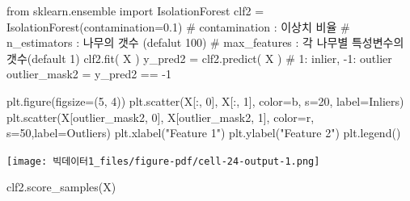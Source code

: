 \documentclass[
  a4paper,
  DIV=11,
  numbers=noendperiod]{scrreprt}
\newenvironment{Shaded}{\begin{snugshade}}{\end{snugshade}}
\newcommand{\CommentTok}[1]{\textcolor[rgb]{0.37,0.37,0.37}{#1}}
\newcommand{\DecValTok}[1]{\textcolor[rgb]{0.68,0.00,0.00}{#1}}
\newcommand{\FloatTok}[1]{\textcolor[rgb]{0.68,0.00,0.00}{#1}}
\newcommand{\ImportTok}[1]{\textcolor[rgb]{0.00,0.46,0.62}{#1}}
\newcommand{\NormalTok}[1]{\textcolor[rgb]{0.00,0.23,0.31}{#1}}
\newcommand{\OperatorTok}[1]{\textcolor[rgb]{0.37,0.37,0.37}{#1}}
\newcommand{\StringTok}[1]{\textcolor[rgb]{0.13,0.47,0.30}{#1}}
\begin{document}
\begin{Shaded}
\begin{Highlighting}[]
\ImportTok{from}\NormalTok{ sklearn.ensemble }\ImportTok{import}\NormalTok{ IsolationForest}
\NormalTok{clf2 }\OperatorTok{=}\NormalTok{ IsolationForest(contamination}\OperatorTok{=}\FloatTok{0.1}\NormalTok{)}
\CommentTok{\# contamination : 이상치 비율}
\CommentTok{\# n\_estimators : 나무의 갯수 (defalut 100)}
\CommentTok{\# max\_features : 각 나무별 특성변수의 갯수(default 1)}
\NormalTok{clf2.fit( X )}
\NormalTok{y\_pred2 }\OperatorTok{=}\NormalTok{ clf2.predict( X ) }\CommentTok{\# 1: inlier, {-}1: outlier}
\NormalTok{outlier\_mask2 }\OperatorTok{=}\NormalTok{ y\_pred2 }\OperatorTok{==} \OperatorTok{{-}}\DecValTok{1}

\NormalTok{plt.figure(figsize}\OperatorTok{=}\NormalTok{(}\DecValTok{5}\NormalTok{, }\DecValTok{4}\NormalTok{))}
\NormalTok{plt.scatter(X[:, }\DecValTok{0}\NormalTok{], X[:, }\DecValTok{1}\NormalTok{], color}\OperatorTok{=}\StringTok{\textquotesingle{}b\textquotesingle{}}\NormalTok{, s}\OperatorTok{=}\DecValTok{20}\NormalTok{, label}\OperatorTok{=}\StringTok{\textquotesingle{}Inliers\textquotesingle{}}\NormalTok{)}
\NormalTok{plt.scatter(X[outlier\_mask2, }\DecValTok{0}\NormalTok{], X[outlier\_mask2, }\DecValTok{1}\NormalTok{], color}\OperatorTok{=}\StringTok{\textquotesingle{}r\textquotesingle{}}\NormalTok{, s}\OperatorTok{=}\DecValTok{50}\NormalTok{,label}\OperatorTok{=}\StringTok{\textquotesingle{}Outliers\textquotesingle{}}\NormalTok{)}
\NormalTok{plt.xlabel(}\StringTok{"Feature 1"}\NormalTok{)}
\NormalTok{plt.ylabel(}\StringTok{"Feature 2"}\NormalTok{)}
\NormalTok{plt.legend()}
\end{Highlighting}
\end{Shaded}

\texttt{[image: 빅데이터1\_files/figure-pdf/cell-24-output-1.png]}

\begin{Shaded}
\begin{Highlighting}[]
\NormalTok{clf2.score\_samples(X)}
\end{Highlighting}
\end{Shaded}
\end{document}
